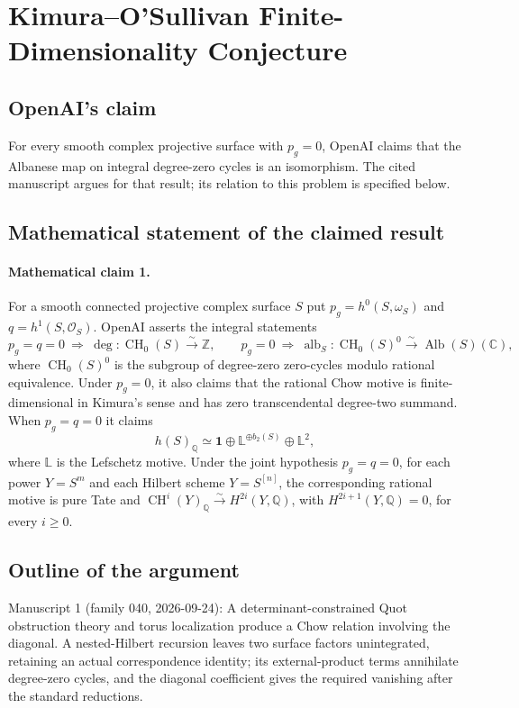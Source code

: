 \documentclass[11pt]{article}
\begin{document}
\section*{Kimura–O'Sullivan Finite-Dimensionality Conjecture}

\subsection{OpenAI's claim}
For every smooth complex projective surface with $p_g=0$, OpenAI claims that the Albanese map on integral degree-zero cycles is an isomorphism. The cited manuscript argues for that result; its relation to this problem is specified below.

\subsection{Mathematical statement of the claimed result}
\paragraph{Mathematical claim 1.} For a smooth connected projective complex surface $S$ put $p_g=h^0(S,\omega_S)$ and $q=h^1(S,\mathcal O_S)$. OpenAI asserts the integral statements
\[
p_g=q=0\ \Longrightarrow\ \deg:\operatorname{CH}_0(S)\xrightarrow{\sim}\mathbb Z,
\qquad
p_g=0\ \Longrightarrow\ \operatorname{alb}_S:\operatorname{CH}_0(S)^0\xrightarrow{\sim}\operatorname{Alb}(S)(\mathbb C),
\]
where $\operatorname{CH}_0(S)^0$ is the subgroup of degree-zero zero-cycles modulo rational equivalence. Under $p_g=0$, it also claims that the rational Chow motive is finite-dimensional in Kimura's sense and has zero transcendental degree-two summand. When $p_g=q=0$ it claims
\[
h(S)_{\mathbb Q}\simeq\mathbf1\oplus\mathbb L^{\oplus b_2(S)}\oplus\mathbb L^2,
\]
where $\mathbb L$ is the Lefschetz motive. Under the joint hypothesis $p_g=q=0$, for each power $Y=S^m$ and each Hilbert scheme $Y=S^{[n]}$, the corresponding rational motive is pure Tate and $\operatorname{CH}^i(Y)_{\mathbb Q}\xrightarrow{\sim}H^{2i}(Y,\mathbb Q)$, with $H^{2i+1}(Y,\mathbb Q)=0$, for every $i\ge0$.

\subsection{Outline of the argument}
Manuscript 1 (family 040, 2026-09-24): A determinant-constrained Quot obstruction theory and torus localization produce a Chow relation involving the diagonal. A nested-Hilbert recursion leaves two surface factors unintegrated, retaining an actual correspondence identity; its external-product terms annihilate degree-zero cycles, and the diagonal coefficient gives the required vanishing after the standard reductions.
\end{document}

